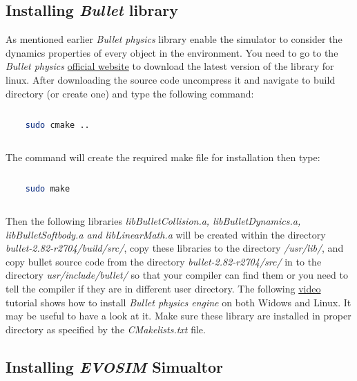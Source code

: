 \documentclass{article}
\begin{document}
\subsection{Installing \emph{Bullet} library}
As mentioned earlier \emph{Bullet physics} library enable the simulator to consider the dynamics properties of every object in the environment. You need to go to the \emph{Bullet physics} \href{http://bulletphysics.org/wordpress/}{official website} to download the latest version of the library for linux.
After downloading the source code uncompress it and navigate to build directory (or create one) and type the following command:
\begin{lstlisting}[language=bash]
  
  	sudo cmake ..
    
  \end{lstlisting}
The command will create the required make file for installation then type:
\begin{lstlisting}[language=bash]
  
  	sudo make
    
  \end{lstlisting}
Then the following libraries \emph{libBulletCollision.a, libBulletDynamics.a, libBulletSoftbody.a and libLinearMath.a} will be created within the directory \emph{bullet-2.82-r2704/build/src/}, copy these libraries to the directory \emph{/usr/lib/}, and copy bullet source code from the directory \emph{bullet-2.82-r2704/src/} in to the directory \emph{usr/include/bullet/} so that your compiler can find them or you need to tell the compiler if they are in different user directory.
The following \href{https://www.youtube.com/watch?v=wbu5MdsFYko}{video} tutorial shows how to install \emph{Bullet physics engine} on both Widows and Linux. It may be useful to have a look at it. 
Make sure these library are installed in proper directory as specified by the \emph{CMakelists.txt} file.

\subsection{Installing \emph{EVOSIM} Simualtor}
\end{document}
